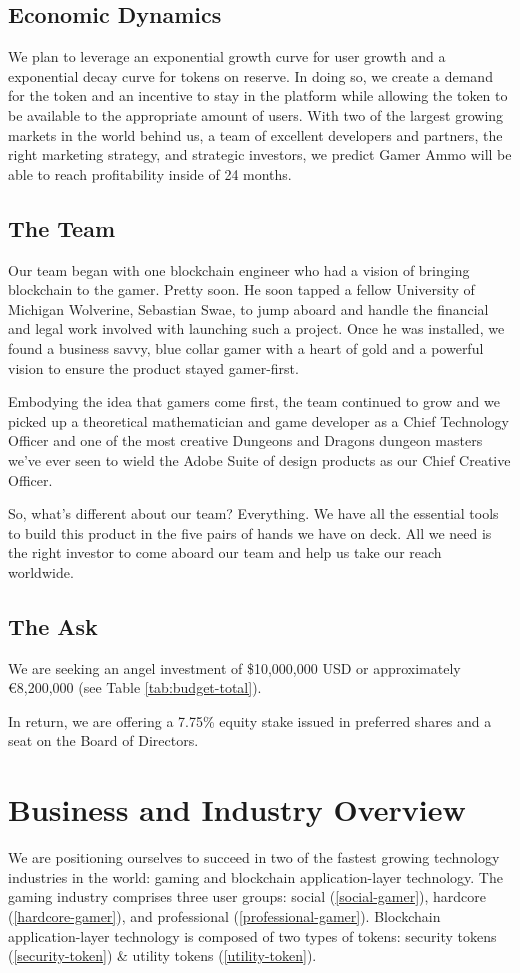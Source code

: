 \documentclass[11pt]{report}
\begin{document}
\section{Economic Dynamics}
We plan to leverage an exponential growth curve for user growth and a exponential decay curve for tokens on reserve. In doing so, we create a demand for the token and an incentive to stay in the platform while allowing the token to be available to the appropriate amount of users. With two of the largest growing markets in the world behind us, a team of excellent developers and partners, the right marketing strategy, and strategic investors, we predict Gamer Ammo will be able to reach profitability inside of 24 months.
\section{The Team}
Our team began with one blockchain engineer who had a vision of bringing blockchain to the gamer. Pretty soon. He soon tapped a fellow University of Michigan Wolverine, Sebastian Swae, to jump aboard and handle the financial and legal work involved with launching such a project. Once he was installed, we found a business savvy, blue collar gamer with a heart of gold and a powerful vision to ensure the product stayed gamer-first.

Embodying the idea that gamers come first, the team continued to grow and we picked up a theoretical mathematician and game developer as a Chief Technology Officer and one of the most creative Dungeons and Dragons dungeon masters we've ever seen to wield the Adobe Suite of design products as our Chief Creative Officer.

So, what's different about our team? Everything. We have all the essential tools to build this product in the five pairs of hands we have on deck. All we need is the right investor to come aboard our team and help us take our reach worldwide.
\section{The Ask}
We are seeking an angel investment of \$10,000,000 USD or approximately \euro8,200,000 (see Table \ref{tab:budget-total}).

In return, we are offering a 7.75\% equity stake issued in preferred shares and a seat on the Board of Directors.
\chapter{Business and Industry Overview}
We are positioning ourselves to succeed in two of the fastest growing technology industries in the world: gaming and blockchain application-layer technology. The gaming industry comprises three user groups: social (\ref{social-gamer}), hardcore (\ref{hardcore-gamer}), and professional (\ref{professional-gamer}). Blockchain application-layer technology is composed of two types of tokens: security tokens (\ref{security-token}) \& utility tokens (\ref{utility-token}).
\end{document}
